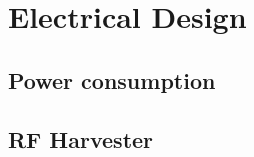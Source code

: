 

\setcounter{section}{4}
\section{Electrical Design}
\bigskip


\subsection{Power consumption}


\subsection{RF Harvester}
